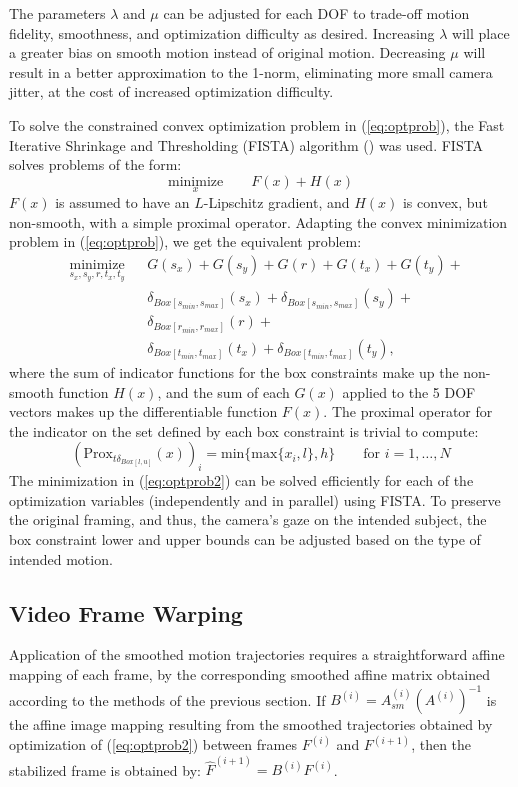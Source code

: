 \documentclass{article} %
\begin{document}
The parameters $\lambda$ and $\mu$ can be adjusted for each DOF to trade-off motion fidelity, smoothness, and optimization difficulty as desired. Increasing $\lambda$ will place a greater bias on smooth motion instead of original motion. Decreasing $\mu$ will result in a better approximation to the 1-norm, eliminating more small camera jitter, at the cost of increased optimization difficulty.

To solve the constrained convex optimization problem in (\ref{eq:optprob}), the Fast Iterative Shrinkage and Thresholding (FISTA) algorithm (\cite{Beck2009}) was used. FISTA solves problems of the form:
\begin{equation*}
  \underset{x}{\text{minimize}} \qquad{} F(x) + H(x)
\end{equation*}
$F(x)$ is assumed to have an $L$-Lipschitz gradient, and $H(x)$ is convex, but non-smooth, with a simple proximal operator. Adapting the convex minimization problem in (\ref{eq:optprob}), we get the equivalent problem:
\begin{align} \label{eq:optprob2}
  & \underset{s_x, s_y, r, t_x, t_y}{\text{minimize}} & & G(s_x) + G(s_y) + G(r) + G(t_x) + G(t_y) + {} \\
  & & & \delta_{Box[s_{min}, s_{max}]}(s_x) + \delta_{Box[s_{min}, s_{max}]}(s_y) + {} \nonumber \\
  & & & \delta_{Box[r_{min}, r_{max}]}(r) + {} \nonumber \\
  & & & \delta_{Box[t_{min}, t_{max}]}(t_x) + \delta_{Box[t_{min}, t_{max}]}(t_y), \nonumber
\end{align}
where the sum of indicator functions for the box constraints make up the non-smooth function $H(x)$, and the sum of each $G(x)$ applied to the 5 DOF vectors makes up the differentiable function $F(x)$. The proximal operator for the indicator on the set defined by each box constraint is trivial to compute:
\begin{equation*}
  (\text{Prox}_{t\delta_{Box[l, u]}}(x))_i = \text{min}\{\text{max}\{x_i, l\}, h\} \qquad{} \text{for } i=1,\dotsc,N
\end{equation*}
The minimization in (\ref{eq:optprob2}) can be solved efficiently for each of the optimization variables (independently and in parallel) using FISTA. To preserve the original framing, and thus, the camera's gaze on the intended subject, the box constraint lower and upper bounds can be adjusted based on the type of intended motion.

\subsection{Video Frame Warping}
Application of the smoothed motion trajectories requires a straightforward affine mapping of each frame, by the corresponding smoothed affine matrix obtained according to the methods of the previous section. If $B^{(i)}=A_{sm}^{(i)}(A^{(i)})^{-1}$ is the affine image mapping resulting from the smoothed trajectories obtained by optimization of (\ref{eq:optprob2}) between frames $F^{(i)}$ and $F^{(i+1)}$, then the stabilized frame is obtained by: $\hat{F}^{(i+1)} = B^{(i)}F^{(i)}$.
\end{document}
